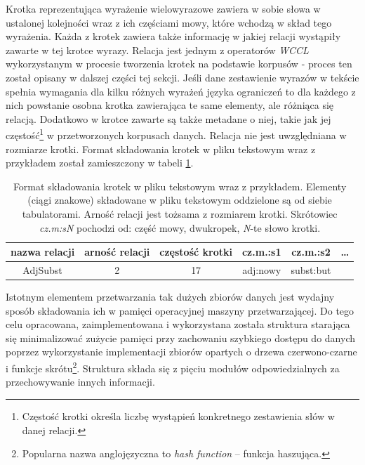 \documentclass[11pt,a4paper]{llncs}
\begin{document}
Krotka reprezentująca wyrażenie wielowyrazowe zawiera w sobie słowa w ustalonej kolejności wraz z ich częściami mowy, które wchodzą w skład tego wyrażenia.
Każda z krotek zawiera także informację w jakiej relacji wystąpiły zawarte w tej krotce wyrazy.
Relacja jest jednym z operatorów \emph{WCCL} wykorzystanym w procesie tworzenia krotek na podstawie korpusów - proces ten został opisany w dalszej części tej sekcji.
Jeśli dane zestawienie wyrazów w tekście spełnia wymagania dla kilku różnych wyrażeń języka ograniczeń to dla każdego z nich powstanie osobna krotka zawierająca te same elementy, ale różniąca się relacją.
Dodatkowo w krotce zawarte są także metadane o niej, takie jak jej częstość\footnote{Częstość krotki określa liczbę wystąpień konkretnego zestawienia słów w danej relacji.} w przetworzonych korpusach danych.
Relacja nie jest uwzględniana w rozmiarze krotki.
Format składowania krotek w pliku tekstowym wraz z przykładem został zamieszczony w tabeli \ref{tuple_format}.

\begin{table}[h!]
\centering
\begin{tabular}{c|c|c|c|c|c}
\toprule
	\textbf{nazwa relacji} & 
		\textbf{arność relacji} & 
		\textbf{częstość krotki} & 
		\textbf{cz.m.:s1} & 
		\textbf{cz.m.:s2} & 
		\ldots \\
	\midrule
	AdjSubst & 2 & 17 & adj:nowy & subst:but & \\
\bottomrule
\end{tabular}
\caption[Format składowania krotek w pliku tekstowym]{Format składowania krotek w pliku tekstowym wraz z przykładem. Elementy (ciągi znakowe) składowane w pliku tekstowym oddzielone są od siebie tabulatorami. Arność relacji jest tożsama z rozmiarem krotki. Skrótowiec \emph{cz.m:sN} pochodzi od: część mowy, dwukropek, \emph{N}-te słowo krotki.}
\label{tuple_format}
\end{table}


Istotnym elementem przetwarzania tak dużych zbiorów danych jest wydajny sposób składowania ich w pamięci operacyjnej maszyny przetwarzającej.
Do tego celu opracowana, zaimplementowana i wykorzystana została struktura starająca się minimalizować zużycie pamięci przy zachowaniu szybkiego dostępu do danych poprzez wykorzystanie implementacji zbiorów opartych o drzewa czerwono-czarne i funkcje skrótu\footnote{Popularna nazwa anglojęzyczna to \emph{hash function} -- funkcja haszująca.}.
Struktura składa się z pięciu modułów odpowiedzialnych za przechowywanie innych informacji.
\end{document}
